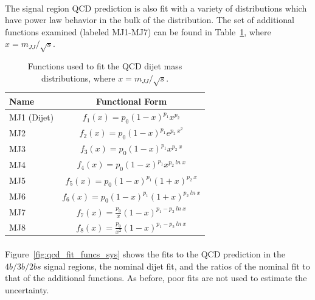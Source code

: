 \paragraph{}
The signal region QCD prediction is also fit with a variety of distributions which have power law behavior in the bulk of the distribution. 
The set of additional functions examined (labeled MJ1-MJ7) can be found in Table~\ref{tab:fit_funcs}, where $x = m_{JJ} / \sqrt{s}$.

\begin{table}[htb!]
\begin{center} 
\begin{tabular}{  l | c}
Name & Functional Form \\
\hline
MJ1 (Dijet) & $f_{1}(x) = p_0 (1-x)^{p_1} x^{p_2}$ \\
MJ2 & $f_{2}(x) = p_0 (1-x)^{p_1} e^{p_2\ x^2}$ \\
MJ3 & $f_{3}(x) = p_0 (1-x)^{p_1} x^{p_2\ x}$ \\
MJ4 & $f_{4}(x) = p_0 (1-x)^{p_1} x^{p_2\ ln\ x}$ \\
MJ5 & $f_{5}(x) = p_0 (1-x)^{p_1} (1+x)^{p_2\ x}$ \\
MJ6 & $f_{6}(x) = p_0 (1-x)^{p_1} (1+x)^{p_2\ ln\ x}$ \\
MJ7 & $f_{7}(x) = \frac{p_0}{x} (1-x)^{p_1 - p_2\ ln\ x}$ \\
MJ8 & $f_{8}(x) = \frac{p_0}{x^2} (1-x)^{p_1 - p_2\ ln\ x}$ \\
\hline
\end{tabular}
\caption{Functions used to fit the QCD dijet mass distributions, where $x = m_{JJ} / \sqrt{s}$.}
\label{tab:fit_funcs}
\end{center}
\end{table}

\paragraph{}
Figure~\ref{fig:qcd_fit_funcs_sys} shows the fits to the QCD prediction in the $4b/3b/2bs$ signal regions, the nominal dijet fit, and the ratios of the nominal fit to that of the additional functions.
As before, poor fits are not used to estimate the uncertainty.

